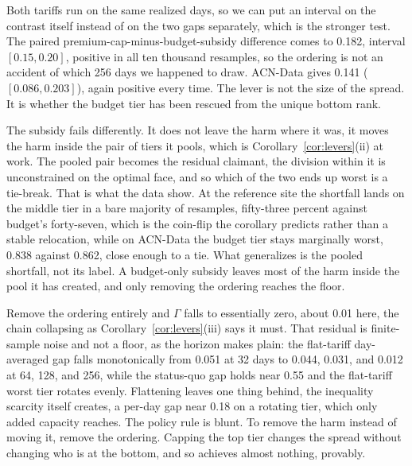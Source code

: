 \documentclass[manuscript, screen, review, anonymous]{acmart}
\begin{document}
Both tariffs run on the same realized days, so we can put an interval on the contrast itself instead of on the two gaps separately, which is the stronger test. The paired premium-cap-minus-budget-subsidy difference comes to 0.182, interval $[0.15, 0.20]$, positive in all ten thousand resamples, so the ordering is not an accident of which 256 days we happened to draw. ACN-Data gives 0.141 ($[0.086, 0.203]$), again positive every time. The lever is not the size of the spread. It is whether the budget tier has been rescued from the unique bottom rank.

The subsidy fails differently. It does not leave the harm where it was, it moves the harm inside the pair of tiers it pools, which is Corollary~\ref{cor:levers}(ii) at work. The pooled pair becomes the residual claimant, the division within it is unconstrained on the optimal face, and so which of the two ends up worst is a tie-break. That is what the data show. At the reference site the shortfall lands on the middle tier in a bare majority of resamples, fifty-three percent against budget's forty-seven, which is the coin-flip the corollary predicts rather than a stable relocation, while on ACN-Data the budget tier stays marginally worst, 0.838 against 0.862, close enough to a tie. What generalizes is the pooled shortfall, not its label. A budget-only subsidy leaves most of the harm inside the pool it has created, and only removing the ordering reaches the floor.

Remove the ordering entirely and $\Gamma$ falls to essentially zero, about 0.01 here, the chain collapsing as Corollary~\ref{cor:levers}(iii) says it must. That residual is finite-sample noise and not a floor, as the horizon makes plain: the flat-tariff day-averaged gap falls monotonically from 0.051 at 32 days to 0.044, 0.031, and 0.012 at 64, 128, and 256, while the status-quo gap holds near 0.55 and the flat-tariff worst tier rotates evenly. Flattening leaves one thing behind, the inequality scarcity itself creates, a per-day gap near 0.18 on a rotating tier, which only added capacity reaches. The policy rule is blunt. To remove the harm instead of moving it, remove the ordering. Capping the top tier changes the spread without changing who is at the bottom, and so achieves almost nothing, provably.
\end{document}

